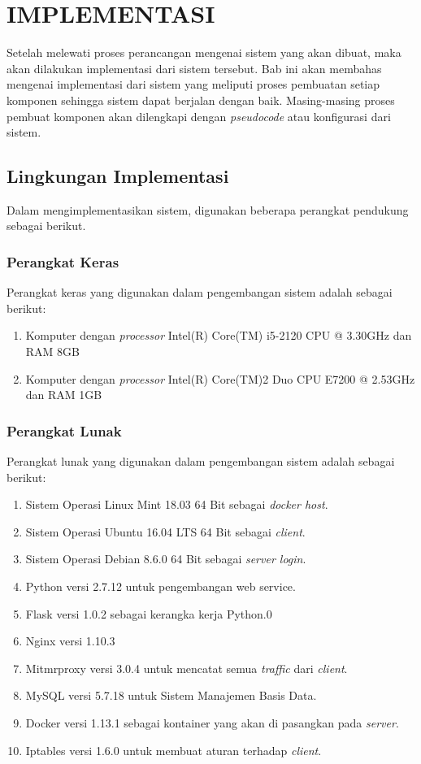 \chapter{IMPLEMENTASI}
Setelah melewati proses perancangan mengenai sistem yang akan dibuat, maka akan dilakukan implementasi dari sistem tersebut. Bab ini akan membahas mengenai implementasi dari sistem yang meliputi proses pembuatan setiap komponen sehingga sistem dapat berjalan dengan baik. Masing-masing proses pembuat komponen akan dilengkapi dengan \textit{pseudocode} atau konfigurasi dari sistem.  
\section{Lingkungan Implementasi}
Dalam mengimplementasikan sistem, digunakan beberapa perangkat pendukung sebagai berikut.
\subsection{Perangkat Keras}
Perangkat keras yang digunakan dalam pengembangan sistem adalah sebagai berikut:
\begin{enumerate}
	\item Komputer dengan \textit{processor} Intel(R) Core(TM) i5-2120 CPU @ 3.30GHz dan RAM 8GB
	\item Komputer dengan \textit{processor} Intel(R) Core(TM)2 Duo CPU E7200 @ 2.53GHz dan RAM 1GB
\end{enumerate}
\subsection{Perangkat Lunak}
Perangkat lunak yang digunakan dalam pengembangan sistem adalah sebagai berikut:
\begin{enumerate}
	\item Sistem Operasi Linux Mint 18.03 64 Bit sebagai \textit{docker host}.
	\item Sistem Operasi Ubuntu 16.04 LTS 64 Bit sebagai \textit{client}.
	\item Sistem Operasi Debian 8.6.0 64 Bit sebagai \textit{server login}.
	\item Python versi 2.7.12 untuk pengembangan web service. 
	\item Flask versi 1.0.2 sebagai kerangka kerja Python.0
	\item Nginx versi 1.10.3
	\item Mitmrproxy versi 3.0.4 untuk mencatat semua \textit{traffic} dari \textit{client}.
	\item MySQL versi 5.7.18 untuk Sistem Manajemen Basis Data.
	\item Docker versi 1.13.1 sebagai kontainer yang akan di pasangkan pada \textit{server}.
	\item Iptables versi 1.6.0 untuk membuat aturan terhadap \textit{client}.
\end{enumerate}

